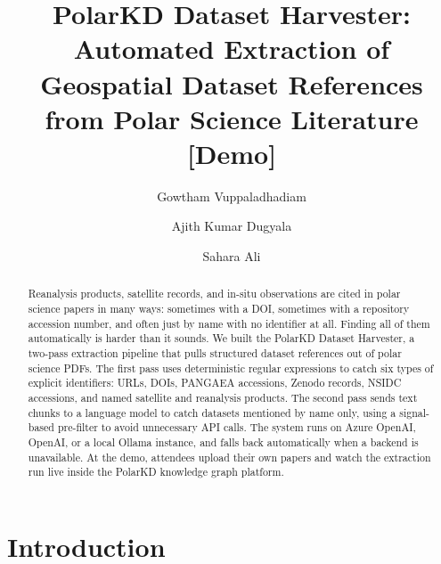 \documentclass[sigconf]{acmart}
\begin{document}
\title{PolarKD Dataset Harvester: Automated Extraction of Geospatial Dataset
  References from Polar Science Literature [Demo]}

\author{Gowtham Vuppaladhadiam}

\author{Ajith Kumar Dugyala}

\author{Sahara Ali}

\begin{abstract}
Reanalysis products, satellite records, and in-situ observations are cited in
polar science papers in many ways: sometimes with a DOI, sometimes with a
repository accession number, and often just by name with no identifier at all.
Finding all of them automatically is harder than it sounds. We built the PolarKD
Dataset Harvester, a two-pass extraction pipeline that pulls structured dataset
references out of polar science PDFs. The first pass uses deterministic regular
expressions to catch six types of explicit identifiers: URLs, DOIs, PANGAEA
accessions, Zenodo records, NSIDC accessions, and named satellite and reanalysis
products. The second pass sends text chunks to a language model to catch datasets
mentioned by name only, using a signal-based pre-filter to avoid unnecessary API
calls. The system runs on Azure OpenAI, OpenAI, or a local Ollama instance, and
falls back automatically when a backend is unavailable. At the demo, attendees
upload their own papers and watch the extraction run live inside the PolarKD
knowledge graph platform.
\end{abstract}


\maketitle

\section{Introduction}
\end{document}
